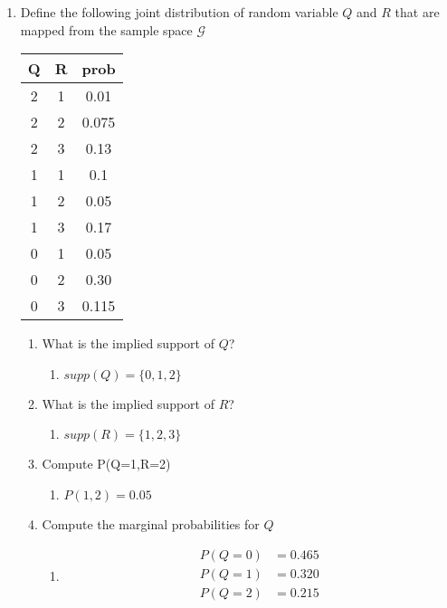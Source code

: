 \documentclass[krantz1,ChapterTOCs]{krantz}
\begin{document}
\begin{enumerate}
    \item  Define the following joint distribution of random variable $Q$ and $R$ that are mapped from the sample space $\mathcal{G}$
    \begin{table}[ht!]
    \centering
    \begin{tabular}{c c | c}
        Q & R & prob \\
        \hline
        2 & 1 & 0.01\\
        2 & 2 & 0.075\\
        2 & 3 & 0.13\\
        1 & 1 & 0.1\\
        1 & 2 & 0.05\\
        1 & 3 & 0.17\\
        0 & 1 & 0.05\\
        0 & 2 & 0.30\\
        0 & 3 & 0.115
    \end{tabular}
    \end{table}

    \begin{enumerate}
        \item What is the implied support of $Q$?
        \begin{enumerate}
            \item {\color{red} $supp(Q) = \{0,1,2\}$   }
        \end{enumerate}
        
        \item What is the implied support of $R$?
        \begin{enumerate}
            \item {\color{red} $supp(R) = \{1,2,3\}$   }
        \end{enumerate}
        
        \item Compute P(Q=1,R=2)
        \begin{enumerate}
            \item {\color{red} $P(1,2) = 0.05$   }
        \end{enumerate}
        
        \item Compute the marginal probabilities for $Q$
        \begin{enumerate}
            \item {\color{red} 
            \begin{align*}
                P(Q=0) &= 0.465\\
                P(Q=1) &= 0.320\\
                P(Q=2) &= 0.215\\
            \end{align*}
            }
        \end{enumerate}
        

\end{enumerate}
\end{enumerate}
\end{document}
